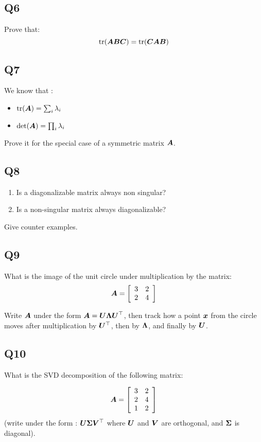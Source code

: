 \documentclass[11pt,oneside,a4paper]{article}
\theoremstyle{definition}
\DeclareRobustCommand{\[}{\begin{equation}}
\DeclareRobustCommand{\]}{\end{equation}}
\begin{document}
\subsection*{Q6}
Prove that: $$\mathrm{tr} ({\bm{A}}{\bm{B}}{\bm{C}}) = \mathrm{tr} ({\bm{C}}{\bm{A}}{\bm{B}}) $$


\subsection*{Q7}
We know that : 
\begin{itemize}
\item $\mathrm{tr}({\bm{A}}) = \sum_i \lambda_i $
\item $\mathrm{det}({\bm{A}}) =  \prod_i \lambda_i $
\end{itemize}

Prove it for the special case of a symmetric matrix ${\bm{A}}$. 

\subsection*{Q8}
\begin{enumerate}[label=(\alph*)]
\item Is a diagonalizable matrix always non singular? 
\item Is a non-singular matrix always diagonalizable? 
\end{enumerate}

Give counter examples.

\subsection*{Q9}
What is the image of the unit circle under multiplication by the matrix: 
$$ {\bm{A}} =  \left[ 
\begin{array}{cc} 
3 & 2 \\
2 & 4  
\end{array} \right]$$ 

Write ${\bm{A}}$ under the form $\displaystyle {\bm{A}} = {\bm{U}} {\bm{\Lambda}} {\bm{U}}^\top$, then 
track how a point $\displaystyle {\bm{x}}$ from the circle moves after multiplication 
by ${\bm{U}}^\top$, then by ${\bm{\Lambda}}$, and finally by ${\bm{U}}$. 

\subsection*{Q10}
What is the SVD decomposition of the following matrix:

$$ {\bm{A}} =  \left[ 
\begin{array}{cc} 
3 & 2 \\
2 & 4  \\ 
1 & 2 \\ 
\end{array} \right]$$
(write under the form : $ {\bm{U}} {\bm{\Sigma}} {\bm{V}}^\top$ where ${\bm{U}}$ and ${\bm{V}}$ are orthogonal, and ${\bm{\Sigma}}$ is diagonal). 
\end{document}

